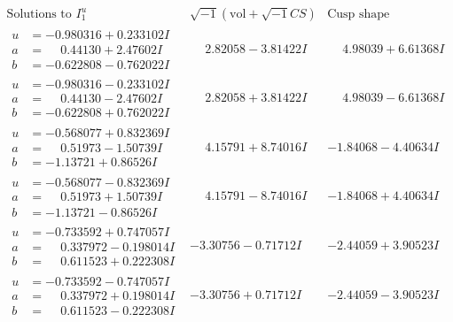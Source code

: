 \documentclass[1p]{elsarticle_modified}
\theoremstyle{definition}
\newcommand{\I}{\sqrt{-1}}
\begin{document}
$$\begin{array}{c|c|c}  
\text{Solutions to }I^u_{1}& \I (\text{vol} + \sqrt{-1}CS) & \text{Cusp shape}\\
 \hline 
\begin{aligned}
u &= -0.980316 + 0.233102 I \\
a &= \phantom{-}0.44130 + 2.47602 I \\
b &= -0.622808 - 0.762022 I\end{aligned}
 & \phantom{-}2.82058 - 3.81422 I & \phantom{-}4.98039 + 6.61368 I \\ \hline\begin{aligned}
u &= -0.980316 - 0.233102 I \\
a &= \phantom{-}0.44130 - 2.47602 I \\
b &= -0.622808 + 0.762022 I\end{aligned}
 & \phantom{-}2.82058 + 3.81422 I & \phantom{-}4.98039 - 6.61368 I \\ \hline\begin{aligned}
u &= -0.568077 + 0.832369 I \\
a &= \phantom{-}0.51973 - 1.50739 I \\
b &= -1.13721 + 0.86526 I\end{aligned}
 & \phantom{-}4.15791 + 8.74016 I & -1.84068 - 4.40634 I \\ \hline\begin{aligned}
u &= -0.568077 - 0.832369 I \\
a &= \phantom{-}0.51973 + 1.50739 I \\
b &= -1.13721 - 0.86526 I\end{aligned}
 & \phantom{-}4.15791 - 8.74016 I & -1.84068 + 4.40634 I \\ \hline\begin{aligned}
u &= -0.733592 + 0.747057 I \\
a &= \phantom{-}0.337972 - 0.198014 I \\
b &= \phantom{-}0.611523 + 0.222308 I\end{aligned}
 & -3.30756 - 0.71712 I & -2.44059 + 3.90523 I \\ \hline\begin{aligned}
u &= -0.733592 - 0.747057 I \\
a &= \phantom{-}0.337972 + 0.198014 I \\
b &= \phantom{-}0.611523 - 0.222308 I\end{aligned}
 & -3.30756 + 0.71712 I & -2.44059 - 3.90523 I \\ \hline\begin{aligned}

\end{aligned}
\end{array}$$
\end{document}
